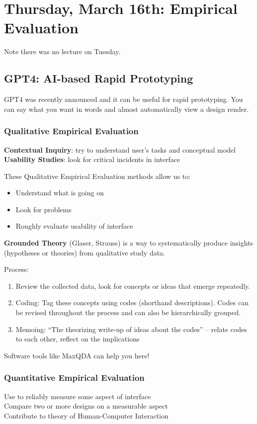 \section{Thursday, March 16th: Empirical Evaluation}
Note there was no lecture on Tuesday.

\subsection{GPT4: AI-based Rapid Prototyping}
GPT4 was recently announced and it can be useful for rapid prototyping. You can say what you want in words and almost automatically view a design render.

\subsubsection{Qualitative Empirical Evaluation}
\textbf{Contextual Inquiry}: try to understand user’s tasks and conceptual model\\
\textbf{Usability Studies}: look for critical incidents in interface

These Qualitative Empirical Evaluation methods allow us to:
\begin{itemize}
    \item Understand what is going on
    \item Look for problems
    \item Roughly evaluate usability of interface
\end{itemize}

\textbf{Grounded Theory} (Glaser, Strauss) is a way to systematically produce
insights (hypotheses or theories) from qualitative study data.

Process:
\begin{enumerate}
    \item  Review the collected data, look for concepts or ideas that emerge repeatedly.
    \item Coding: Tag these concepts using codes (shorthand descriptions). 
    Codes can be revised throughout the process and can also be hierarchically grouped.
    \item Memoing: “The theorizing write-up of ideas about the codes” – relate codes to each other, reflect on the implications
\end{enumerate}

Software tools like MaxQDA can help you here!

\subsubsection{Quantitative Empirical Evaluation}
Use to reliably measure some aspect of interface\\
Compare two or more designs on a measurable aspect\\
Contribute to theory of Human-Computer Interaction

